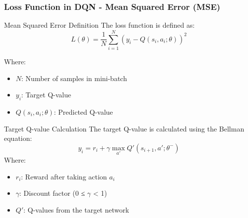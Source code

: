 \documentclass[aspectratio=169]{beamer}
\begin{document}
\begin{frame}[fragile]
    \frametitle{Loss Function in DQN - Mean Squared Error (MSE)}
    \begin{block}{Mean Squared Error Definition}
        The loss function is defined as:
        \[
        L(\theta) = \frac{1}{N} \sum_{i=1}^{N} (y_i - Q(s_i, a_i; \theta))^2
        \]

        Where:
        \begin{itemize}
            \item \(N\): Number of samples in mini-batch
            \item \(y_i\): Target Q-value
            \item \(Q(s_i, a_i; \theta)\): Predicted Q-value
        \end{itemize}
    \end{block}

    \begin{block}{Target Q-value Calculation}
        The target Q-value is calculated using the Bellman equation:
        \[
        y_i = r_i + \gamma \max_{a'} Q'(s_{i+1}, a'; \theta^-)
        \]
        Where:
        \begin{itemize}
            \item \(r_i\): Reward after taking action \(a_i\)
            \item \(\gamma\): Discount factor (0 ≤ $\gamma$ < 1)
            \item \(Q'\): Q-values from the target network
        \end{itemize}
    \end{block}
\end{frame}
\end{document}
